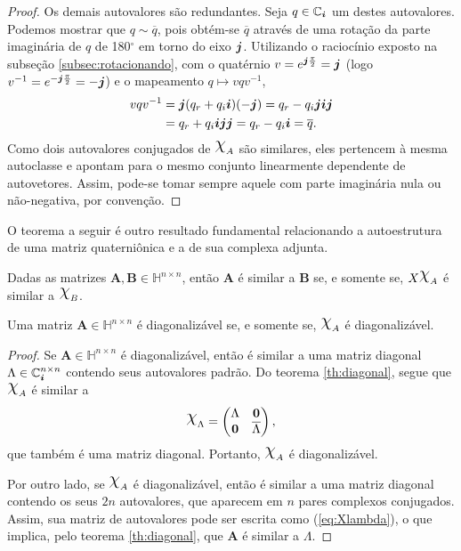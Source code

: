 \begin{proof}
Os demais autovalores s\~ao redundantes. Seja $ q \in \mathbb{C}_{\boldsymbol{i}}$ um destes autovalores. Podemos mostrar que $ q \sim \overline{q} $, pois obt\'em-se $ \overline{q} $ atrav\'es de uma rota\c c\~ao da parte imagin\'aria de $ q $ de 180$ ^\circ $ em torno do eixo $ \boldsymbol{j} $. Utilizando o racioc\'inio exposto na subse\c c\~ao \ref{subsec:rotacionando}, com o quat\'ernio $ v = e^{\boldsymbol{j} \frac{\pi}{2}} = \boldsymbol{j} $ (logo $ v^{-1} = e^{- \boldsymbol{j} \frac{\pi}{2}} = -\boldsymbol{j} $) e o mapeamento $ q \mapsto v q v^{-1} $,
\begin{equation}
\begin{aligned}
v q v^{-1} &= \boldsymbol{j} (q_r + q_i \boldsymbol{i}) (-\boldsymbol{j}) = q_r - q_i \boldsymbol{j} \boldsymbol{i} \boldsymbol{j}\\
&= q_r + q_i \boldsymbol{i} \boldsymbol{j} \boldsymbol{j} = q_r - q_i \boldsymbol{i} = \overline{q}.
\end{aligned}
\end{equation}
Como dois autovalores conjugados de $ \rchi_A $ s\~ao similares, eles pertencem \`a mesma autoclasse e apontam para o mesmo conjunto linearmente dependente de autovetores. Assim, pode-se tomar sempre aquele com parte imagin\'aria nula ou n\~ao-negativa, por conven\c c\~ao.
\end{proof}

O teorema a seguir \'e outro resultado fundamental relacionando a autoestrutura de uma matriz quaterni\^onica e a de sua complexa adjunta.

\begin{theorem}
\label{th:diagonal}
Dadas as matrizes $ \mathbf{A}, \mathbf{B} \in \mathbb{H}^{n \times n} $, ent\~ao $ \mathbf{A} $ \'e similar a $ \mathbf{B} $ se, e somente se, $ X\rchi_A $ \'e similar a $ \rchi_B $.
\end{theorem}

\begin{corollary}
Uma matriz $  \mathbf{A} \in \mathbb{H}^{n \times n} $ \'e diagonaliz\'avel se, e somente se, $ \rchi_A $ \'e diagonaliz\'avel.
\end{corollary}
\begin{proof}
Se $ \mathbf{A} \in \mathbb{H}^{n \times n} $ \'e diagonaliz\'avel, ent\~ao \'e similar a uma matriz diagonal $ \Lambda \in \mathbb{C}^{n \times n}_{\boldsymbol{i}} $ contendo seus autovalores padr\~ao. Do teorema \ref{th:diagonal}, segue que $ \rchi_A $ \'e similar a
\begin{equation}
\label{eq:Xlambda}
\rchi_{\Lambda} =
\begin{pmatrix}
\Lambda & \mathbf{0}\\ 
\mathbf{0} & \overline{\Lambda}
\end{pmatrix},
\end{equation}
que tamb\'em \'e uma matriz diagonal. Portanto, $ \rchi_A $ \'e diagonaliz\'avel.

Por outro lado, se $ \rchi_A $ \'e diagonaliz\'avel, ent\~ao \'e similar a uma matriz diagonal contendo os seus $ 2n $ autovalores, que aparecem em $ n $ pares complexos conjugados. Assim, sua matriz de autovalores pode ser escrita como (\ref{eq:Xlambda}), o que implica, pelo teorema \ref{th:diagonal}, que $ \mathbf{A} $ \'e similar a $ \Lambda $.
\end{proof}

